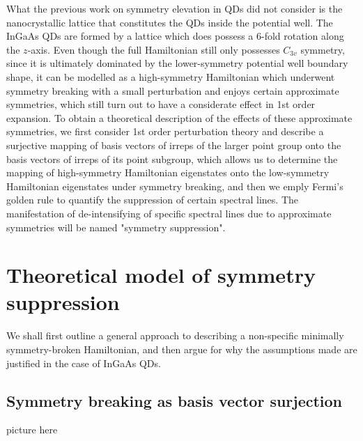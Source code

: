 \documentclass[12pt]{article}
\begin{document}
	What the previous work on symmetry elevation in QDs did not consider is the nanocrystallic lattice that constitutes the QDs inside the potential well. The InGaAs QDs are formed by a lattice which does possess a 6-fold rotation along the $z$-axis. Even though the full Hamiltonian still only possesses $C_{3v}$ symmetry, since it is ultimately dominated by the lower-symmetry potential well boundary shape, it can be modelled as a high-symmetry Hamiltonian which underwent symmetry breaking with a small perturbation and enjoys certain approximate symmetries, which still turn out to have a considerate effect in 1st order expansion. To obtain a theoretical description of the effects of these approximate symmetries, we first consider 1st order perturbation theory and describe a surjective mapping of basis vectors of irreps of the larger point group onto the basis vectors of irreps of its point subgroup, which allows us to determine the mapping of high-symmetry Hamiltonian eigenstates onto the low-symmetry Hamiltonian eigenstates under symmetry breaking, and then we emply Fermi's golden rule to quantify the suppression of certain spectral lines. The manifestation of de-intensifying of specific spectral lines due to approximate symmetries will be named "symmetry suppression".
	
	\section{Theoretical model of symmetry suppression}
	We shall first outline a general approach to describing a non-specific minimally symmetry-broken Hamiltonian, and then argue for why the assumptions made are justified in the case of InGaAs QDs. 
	\subsection{Symmetry breaking as basis vector surjection}
	
	picture here
\end{document}
